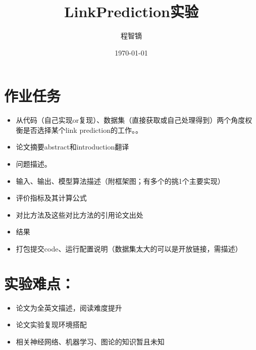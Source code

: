 \documentclass{article}
\title{LinkPrediction实验}
\author{程智镝}
\date{\today}
\begin{document}
\maketitle

\section*{作业任务}
\begin{itemize}
    \item 从代码（自己实现or复现）、数据集（直接获取或自己处理得到）两个角度权衡是否选择某个link prediction的工作。。
    \item 论文摘要abstract和introduction翻译
    \item 问题描述。
    \item 输入、输出、模型算法描述（附框架图；有多个的挑1个主要实现）
    \item 评价指标及其计算公式
    \item 对比方法及这些对比方法的引用论文出处
    \item 结果
    \item 打包提交code、运行配置说明（数据集太大的可以是开放链接，需描述）
\end{itemize}
\section*{实验难点：}
\begin{itemize}
    \item 论文为全英文描述，阅读难度提升
    \item 论文实验复现环境搭配
    \item 相关神经网络、机器学习、图论的知识暂且未知
\end{itemize}
\end{document}
